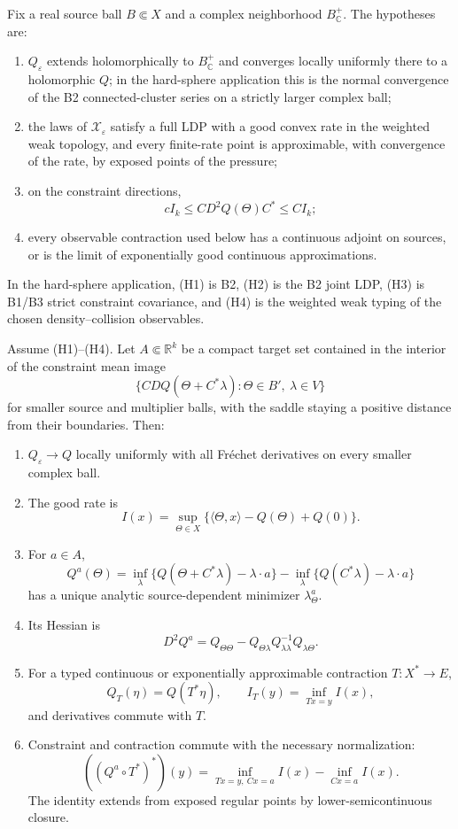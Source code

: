 Fix a real source ball \(B\Subset X\) and a complex neighborhood
\(B_{\mathbb C}^+\).  The hypotheses are:
\begin{enumerate}[label=(H\arabic*)]
\item \(Q_\varepsilon\) extends holomorphically to \(B_{\mathbb C}^+\)
      and converges locally uniformly there to a holomorphic \(Q\); in the
      hard-sphere application this is the normal convergence of the B2
      connected-cluster series on a strictly larger complex ball;
\item the laws of \(\mathcal X_\varepsilon\) satisfy a full LDP with a good
      convex rate in the weighted weak topology, and every finite-rate point
      is approximable, with convergence of the rate, by exposed points of the
      pressure;
\item on the constraint directions,
\[
 cI_k\le C D^2Q(\Theta)C^*\le CI_k;
\]
\item every observable contraction used below has a continuous adjoint on
      sources, or is the limit of exponentially good continuous
      approximations.
\end{enumerate}
In the hard-sphere application, (H1) is B2, (H2) is the B2 joint LDP, (H3) is
B1/B3 strict constraint covariance, and (H4) is the weighted weak typing of
the chosen density--collision observables.

\begin{theorem}
\label{thm:r3-d1-commutation}
Assume (H1)--(H4).  Let \(A\Subset\mathbb R^k\) be a compact target set
contained in the interior of the constraint mean image
\[
 \{CDQ(\Theta+C^*\lambda):
 \Theta\in B',\ \lambda\in V\}
\]
for smaller source and multiplier balls, with the saddle staying a positive
distance from their boundaries.  Then:
\begin{enumerate}[label=(\roman*)]
\item \(Q_\varepsilon\to Q\) locally uniformly with all Fr\'echet
      derivatives on every smaller complex ball.
\item The good rate is
\[
 I(x)=\sup_{\Theta\in X}
 \{\langle\Theta,x\rangle-Q(\Theta)+Q(0)\}.
\]
\item For \(a\in A\),
\[
 Q^a(\Theta)
 =\inf_\lambda\{Q(\Theta+C^*\lambda)-\lambda\cdot a\}
 -\inf_\lambda\{Q(C^*\lambda)-\lambda\cdot a\}
\]
has a unique analytic source-dependent minimizer \(\lambda_\Theta^a\).
\item Its Hessian is
\[
 D^2Q^a
 =Q_{\Theta\Theta}
 -Q_{\Theta\lambda}Q_{\lambda\lambda}^{-1}
 Q_{\lambda\Theta}.
\]
\item For a typed continuous or exponentially approximable contraction
      \(T:X^*\to E\),
\[
 Q_T(\eta)=Q(T^*\eta),
 \qquad I_T(y)=\inf_{Tx=y}I(x),
\]
and derivatives commute with \(T\).
\item Constraint and contraction commute with the necessary normalization:
\[
 \boxed{
 ((Q^a\circ T^*)^*)(y)
 =\inf_{Tx=y,\ Cx=a}I(x)
 -\inf_{Cx=a}I(x).}
\]
The identity extends from exposed regular points by lower-semicontinuous
closure.
\end{enumerate}
\end{theorem}

